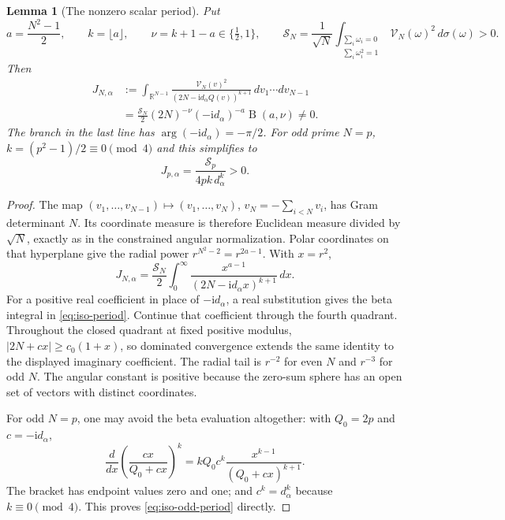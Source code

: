\documentclass[11pt]{article}
\numberwithin{equation}{section}
\newtheorem{lemma}[theorem]{Lemma}
\theoremstyle{definition}
\newcommand{\R}{\mathbb R}
\newcommand{\ii}{\mathrm i}
\begin{document}
\begin{lemma}[The nonzero scalar period]
\label{lem:iso-period}
Put
\[
 a=\frac{N^2-1}{2},\qquad k=\lfloor a\rfloor,\qquad
 \nu=k+1-a\in\{\tfrac12,1\},\qquad
 \mathcal S_N=\frac1{\sqrt N}
      \int_{\substack{\sum_i\omega_i=0\\\sum_i\omega_i^2=1}}
           \mathcal V_N(\omega)^2\,d\sigma(\omega)>0.
\]
Then
\begin{align}
 J_{N,\alpha}
  &:=\int_{\R^{N-1}}
     \frac{\mathcal V_N(v)^2}
          {(2N-\ii d_\alpha Q(v))^{k+1}}\,dv_1\cdots dv_{N-1}
          \nonumber\\
  &=\frac{\mathcal S_N}{2}(2N)^{-\nu}
      (-\ii d_\alpha)^{-a}\operatorname B(a,\nu)\ne0.
                                      \label{eq:iso-period}
\end{align}
The branch in the last line has $\arg(-\ii d_\alpha)=-\pi/2$.
For odd prime $N=p$, $k=(p^2-1)/2\equiv0\pmod4$ and this simplifies to
\begin{equation}\label{eq:iso-odd-period}
 J_{p,\alpha}=\frac{\mathcal S_p}{4pk\,d_\alpha^k}>0.
\end{equation}
\end{lemma}
\begin{proof}
The map $(v_1,\ldots,v_{N-1})\mapsto(v_1,\ldots,v_N)$,
$v_N=-\sum_{i<N}v_i$, has Gram determinant $N$.
Its coordinate measure is therefore Euclidean measure divided by
$\sqrt N$, exactly as in the constrained angular normalization.
Polar coordinates on that hyperplane give the radial power
$r^{N^2-2}=r^{2a-1}$.  With $x=r^2$,
\[
 J_{N,\alpha}=\frac{\mathcal S_N}{2}
   \int_0^\infty\frac{x^{a-1}}{(2N-\ii d_\alpha x)^{k+1}}\,dx.
\]
For a positive real coefficient in place of $-\ii d_\alpha$,
a real substitution gives the beta integral in
\eqref{eq:iso-period}.  Continue that coefficient through the fourth
quadrant.  Throughout the closed quadrant at fixed positive modulus,
$|2N+cx|\ge c_0(1+x)$, so dominated convergence extends the same
identity to the displayed imaginary coefficient.  The radial tail
is $r^{-2}$ for even $N$ and $r^{-3}$ for odd $N$.
The angular constant is positive because the zero-sum sphere has
an open set of vectors with distinct coordinates.

For odd $N=p$, one may avoid the beta evaluation altogether:
with $Q_0=2p$ and $c=-\ii d_\alpha$,
\[
 \frac{d}{dx}\left(\frac{cx}{Q_0+cx}\right)^k
   =kQ_0c^k\frac{x^{k-1}}{(Q_0+cx)^{k+1}}.
\]
The bracket has endpoint values zero and one; and
$c^k=d_\alpha^k$ because $k\equiv0\pmod4$.
This proves \eqref{eq:iso-odd-period} directly.
\end{proof}
\end{document}
